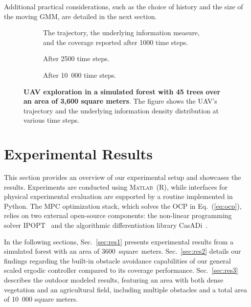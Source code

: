 \documentclass[letterpaper,10pt,conference,twoside]{IEEEtran}
\theoremstyle{definition}
\begin{document}
Additional practical considerations, such as the choice of history and the size of the moving GMM, are detailed in the next section.



\begin{figure}[t!]
  \centering
  \vspace*{-.3cm}
  \begin{subfigure}[t]{\linewidth}
  \hspace*{-.15cm}
  \caption{The trajectory, the underlying information measure, and the coverage reported after 1000 time steps.}
  \label{fig:1-1}
  \end{subfigure}
  \begin{subfigure}[t]{\linewidth}
  \hspace*{-.15cm}
  \caption{After 2500 time steps.}
  \label{fig:1-2}
  \end{subfigure}
  \begin{subfigure}[t]{\linewidth}
  \hspace*{-.15cm}
  \caption{After 10~000 time steps.}
  \label{fig:1-3}
  \end{subfigure}
  \caption{\textbf{UAV exploration in a simulated forest with 45 trees over an area of 3,600 square meters}. The figure shows the UAV's trajectory and the underlying information density distribution at various time steps.}
  \label{fig:1}
\end{figure}


\section{Experimental Results}\label{sec:res}
\noindent
This section provides an overview of our experimental setup and showcases the results. 
Experiments are conducted using \textsc{Matlab}~(R), while interfaces for physical experimental evaluation are supported by a routine implemented in Python. The MPC optimization stack, which solves the OCP in Eq.~(\ref{eq:ocp}), relies on two external open-source components: the non-linear programming solver IPOPT~\cite{wachter2006implementation} and the algorithmic differentiation library CasADi~\cite{andersson2012casadi}.

In the following sections, Sec.~\ref{sec:res1} presents experimental results from a simulated forest with an area of 3600~square~meters. Sec.~\ref{sec:res2} details our findings regarding the built-in obstacle avoidance capabilities of our general scaled ergodic controller compared to its coverage performance. Sec.~\ref{sec:res3} describes the outdoor modeled results, featuring an area with both dense vegetation and an agricultural field, including multiple obstacles and a total area of 10~000 square meters.
\end{document}

